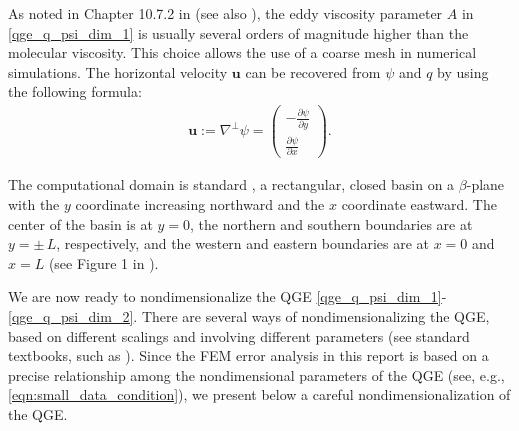 As noted in Chapter 10.7.2 in \cite{Vallis06} (see also \cite{San12}), the eddy
viscosity parameter $A$ in \eqref{qge_q_psi_dim_1} is usually several orders of
magnitude higher than the molecular viscosity. This choice allows the use of a
coarse mesh in numerical simulations. The horizontal velocity $\mathbf{u}$ can
be recovered from $\psi$ and $q$ by using the following formula:
\begin{align}
  \mathbf{u} := \nabla^{\perp} \psi =
    \begin{pmatrix} - \frac{\partial \psi}{\partial y} \\
    \frac{\partial \psi}{\partial x}
  \end{pmatrix} .
\label{eqn:u_psi}
\end{align}

The computational domain is standard \cite{Greatbatch00}, a rectangular, closed
basin on a $\beta$-plane with the $y$ coordinate increasing northward and the
$x$ coordinate eastward. The center of the basin is at $y=0$, the northern and
southern boundaries are at $y = \pm \, L$, respectively, and the western and
eastern boundaries are at $x = 0$ and $x = L$ (see Figure 1 in
\cite{Greatbatch00}).

We are now ready to nondimensionalize the QGE
\eqref{qge_q_psi_dim_1}-\eqref{qge_q_psi_dim_2}.  There are several ways of
nondimensionalizing the QGE, based on different scalings and involving different
parameters (see standard textbooks, such as
\cite{Cushman11,Majda,Pedlosky92,Vallis06}).  Since the FEM error analysis in
this report is based on a precise relationship among the nondimensional
parameters of the QGE (see, e.g., \eqref{eqn:small_data_condition}), we present
below a careful nondimensionalization of the QGE.

